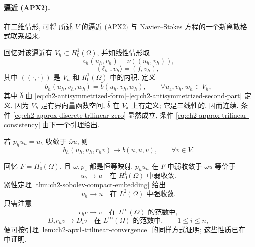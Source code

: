 \paragraph{逼近 (APX2).}
在二维情形, 可将  所述 $V$ 的逼近 (APX2) 与 Navier--Stokes 方程的一个新离散格式联系起来.

\hypertarget{chapter-02-page-156}{}
回忆对该逼近有 $V_h\subset H_0^1(\Omega)$, 并如线性情形取
\begin{equation}
a_h(u_h,v_h)=\nu((u_h,v_h)),
\label{eq:ch2-apx2-bilinear-form}
\end{equation}
\begin{equation}
\langle\ell_h,v_h\rangle=(f,v_h),
\label{eq:ch2-apx2-load-form}
\end{equation}
其中 $((\cdot,\cdot))$ 是 $V_h$ 和 $H_0^1(\Omega)$ 中的内积. 定义
\begin{equation}
b_h(u_h,v_h,w_h)=\widehat b(u_h,v_h,w_h),
\qquad\forall u_h,v_h,w_h\in V_h,
\label{eq:ch2-apx2-trilinear-form}
\end{equation}
其中 $\widehat b$ 由 \eqref{eq:ch2-antisymmetrized-form}--\eqref{eq:ch2-antisymmetrized-second-part} 定义. 因为 $V_h$ 是有界向量函数空间, $\widehat b$ 在 $V_h$ 上有定义; 它是三线性的, 因而连续. 条件 \eqref{eq:ch2-approx-discrete-trilinear-zero} 显然成立, 条件 \eqref{eq:ch2-approx-trilinear-consistency} 由下一个引理给出.

\begin{Lemma}
\label{lem:ch2-apx2-trilinear-convergence}
若 $p_hu_h=u_h$ 收敛于 $\overline\omega u$, 则
\begin{equation}
b_h(u_h,u_h,r_hv)\longrightarrow b(u,u,v),
\qquad\forall v\in V.
\label{eq:ch2-apx2-trilinear-convergence}
\end{equation}
\end{Lemma}

\begin{Proof}
回忆 $F=H_0^1(\Omega)$, 且 $\overline\omega,p_h$ 都是恒等映射. $p_hu_h$ 在 $F$ 中弱收敛于 $\overline\omega u$ 等价于
\begin{equation}
u_h\longrightarrow u\quad\text{在 }H_0^1(\Omega)\text{ 中弱收敛}.
\label{eq:ch2-apx2-weak-h1}
\end{equation}
紧性定理 \ref{thm:ch2-sobolev-compact-embedding} 给出
\begin{equation}
u_h\longrightarrow u\quad\text{在 }L^2(\Omega)\text{ 中强收敛}.
\label{eq:ch2-apx2-strong-l2}
\end{equation}
只需注意
\begin{equation}
r_hv\longrightarrow v\quad\text{在 }L^\infty(\Omega)\text{ 的范数中},
\label{eq:ch2-apx2-lift-uniform}
\end{equation}
\begin{equation}
D_ir_hv\longrightarrow D_iv\quad\text{在 }L^\infty(\Omega)\text{ 的范数中},
\qquad1\leq i\leq n,
\label{eq:ch2-apx2-lift-derivative-uniform}
\end{equation}
便可按引理 \ref{lem:ch2-apx1-trilinear-convergence} 的同样方式证明; 这些性质已在  中证明.
\end{Proof}

